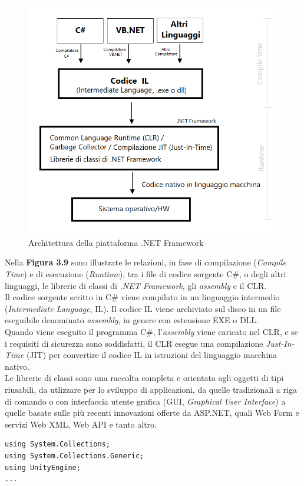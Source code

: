 \begin{figure}[H]
    \centering
    \includegraphics[scale = 0.6]{Immagini/architettura-framework-dotnet.png}
    \caption{Architettura della piattaforma .NET Framework}
    \label{fig:my_label}
\end{figure}
\hspace{-0.6cm}Nella \textbf{Figura 3.9} sono illustrate le relazioni, in fase di compilazione (\textit{Compile Time}) e di esecuzione (\textit{Runtime}), tra i file di codice sorgente C\#, o degli altri linguaggi, le librerie di classi di \textit{.NET Framework}, gli \textit{assembly} e il CLR.
\\Il codice sorgente scritto in C\# viene compilato in un linguaggio intermedio (\textit{Intermediate Language}, IL). Il codice IL viene archiviato sul disco in un file eseguibile denominato \textit{assembly}, in genere con estensione EXE o DLL.
\\Quando viene eseguito il programma C\#, l'\textit{assembly} viene caricato nel CLR, e se i requisiti di sicurezza sono soddisfatti, il CLR esegue una compilazione \textit{Just-In-Time} (JIT) per convertire il codice IL in istruzioni del linguaggio macchina nativo.
\\Le librerie di classi sono una raccolta completa e orientata agli oggetti di tipi riusabili, da utlizzare per lo sviluppo di applicazioni, da quelle tradizionali a riga di comando o con interfaccia utente grafica (GUI, \textit{Graphical User Interface}) a quelle basate sulle più recenti innovazioni offerte da ASP.NET, quali Web Form e servizi Web XML, Web API e tanto altro.
\begin{lstlisting}[caption = Esempio di utilizzo di librerie in C\#]
using System.Collections;
using System.Collections.Generic;
using UnityEngine;
...
\end{lstlisting}
